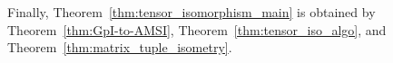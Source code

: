 Finally, Theorem~\ref{thm:tensor_isomorphism_main} is obtained by Theorem~\ref{thm:GpI-to-AMSI}, Theorem~\ref{thm:tensor_iso_algo}, and Theorem~\ref{thm:matrix_tuple_isometry}. 







